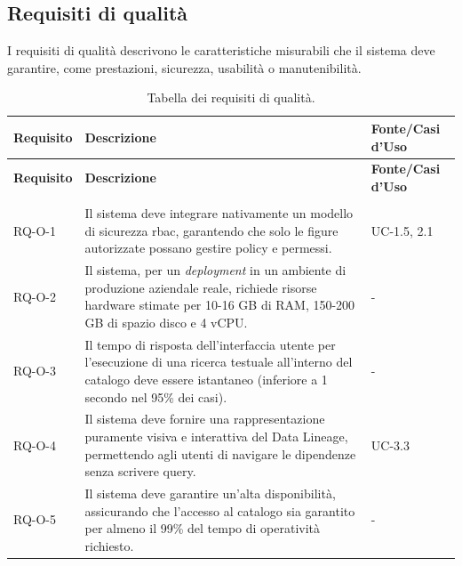 \subsection{Requisiti di qualità}
I requisiti di qualità descrivono le caratteristiche misurabili che il sistema deve garantire, come prestazioni, sicurezza, usabilità o manutenibilità.

\begin{longtable}{ p{} p{} p{} }
\toprule
\textbf{Requisito} & \textbf{Descrizione} & \textbf{Fonte/Casi d'Uso} \\
\midrule
\endfirsthead

\toprule
\textbf{Requisito} & \textbf{Descrizione} & \textbf{Fonte/Casi d'Uso} \\
\midrule
\endhead

\midrule
\noalign{\vspace{10pt}}
\caption[]{Tabella dei requisiti di qualità.} \\
\endfoot

\bottomrule
\noalign{\vspace{10pt}}
\caption{Tabella dei requisiti di qualità.}
\label{tab:requisiti-qualita}
\endlastfoot

RQ-O-1 & Il sistema deve integrare nativamente un modello di sicurezza \gls{rbac}, garantendo che solo le figure autorizzate possano gestire policy e permessi. & UC-1.5, 2.1 \\ \midrule
RQ-O-2 & Il sistema, per un \emph{deployment} in un ambiente di produzione aziendale reale, richiede risorse hardware stimate per 10-16 GB di RAM, 150-200 GB di spazio disco e 4 vCPU. & - \\ \midrule
RQ-O-3 & Il tempo di risposta dell'interfaccia utente per l'esecuzione di una ricerca testuale all'interno del catalogo deve essere istantaneo (inferiore a 1 secondo nel 95\% dei casi). & - \\ \midrule
RQ-O-4 & Il sistema deve fornire una rappresentazione puramente visiva e interattiva del Data Lineage, permettendo agli utenti di navigare le dipendenze senza scrivere query. & UC-3.3 \\ \midrule
RQ-O-5 & Il sistema deve garantire un'alta disponibilità, assicurando che l'accesso al catalogo sia garantito per almeno il 99\% del tempo di operatività richiesto. & - \\

\end{longtable}


